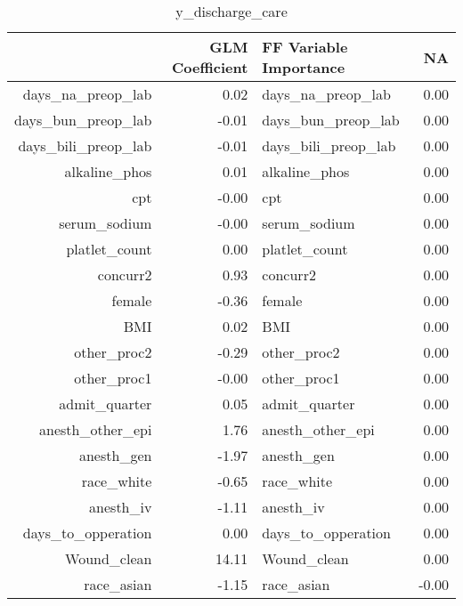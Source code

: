 \begin{table}[ht]
\centering
\begin{tabular}{rrlr}
  \hline
 & GLM Coefficient & FF Variable Importance & NA \\ 
  \hline
days\_na\_preop\_lab & 0.02 & days\_na\_preop\_lab & 0.00 \\ 
  days\_bun\_preop\_lab & -0.01 & days\_bun\_preop\_lab & 0.00 \\ 
  days\_bili\_preop\_lab & -0.01 & days\_bili\_preop\_lab & 0.00 \\ 
  alkaline\_phos & 0.01 & alkaline\_phos & 0.00 \\ 
  cpt & -0.00 & cpt & 0.00 \\ 
  serum\_sodium & -0.00 & serum\_sodium & 0.00 \\ 
  platlet\_count & 0.00 & platlet\_count & 0.00 \\ 
  concurr2 & 0.93 & concurr2 & 0.00 \\ 
  female & -0.36 & female & 0.00 \\ 
  BMI & 0.02 & BMI & 0.00 \\ 
  other\_proc2 & -0.29 & other\_proc2 & 0.00 \\ 
  other\_proc1 & -0.00 & other\_proc1 & 0.00 \\ 
  admit\_quarter & 0.05 & admit\_quarter & 0.00 \\ 
  anesth\_other\_epi & 1.76 & anesth\_other\_epi & 0.00 \\ 
  anesth\_gen & -1.97 & anesth\_gen & 0.00 \\ 
  race\_white & -0.65 & race\_white & 0.00 \\ 
  anesth\_iv & -1.11 & anesth\_iv & 0.00 \\ 
  days\_to\_opperation & 0.00 & days\_to\_opperation & 0.00 \\ 
  Wound\_clean & 14.11 & Wound\_clean & 0.00 \\ 
  race\_asian & -1.15 & race\_asian & -0.00 \\ 
   \hline
\end{tabular}
\caption{y_discharge_care} 
\end{table}

